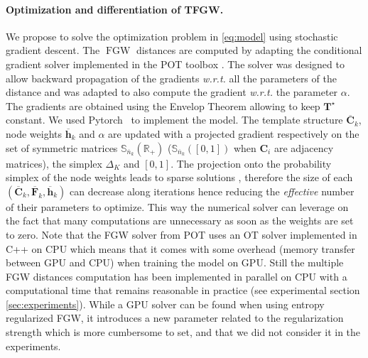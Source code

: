 \documentclass{article}
\def\vh{{\bm{h}}}
\def\mC{{\bm{C}}}
\def\mF{{\bm{F}}}
\def\mT{{\bm{T}}}
\def\sS{{\mathbb{S}}}
\newcommand{\R}{\mathbb{R}}
\newcommand{\FGW}{\operatorname{FGW}}
\begin{document}
\paragraph{Optimization and differentiation of TFGW.} 
We propose to solve the optimization problem in \eqref{eq:model} using stochastic
gradient descent. The $\FGW$ distances are
computed by adapting the conditional gradient solver implemented in the POT
toolbox \cite{flamary2021pot}.
The solver was designed to allow backward propagation of the gradients \textit{w.r.t.}
all the parameters of the distance and was adapted to also compute the gradient
\emph{w.r.t.} the parameter $\alpha$. The gradients are obtained using the
Envelop Theorem \cite{afriat1971theory} allowing to keep $\mT^\star$ constant.
We used Pytorch~\cite{paszke2017automatic} to implement the model. 
The template structure $\overline{\mC}_k$, node weights $\overline{\vh}_k$ and $\alpha$ are updated with a projected gradient respectively on the set of 
symmetric matrices $\sS_{\overline{n}_k}(\R_+)$ ($\sS_{\overline{n}_k}([0,1])$
when $\mC_i$ are adjacency matrices), the simplex $\Delta_K$ and $[0,1]$.
The projection onto the probability simplex of the node weights leads to sparse solutions \cite{condat2016fast}, therefore
the size of each $(\overline{\mC}_k, \overline{\mF}_k, \overline{\vh}_k)$ can decrease along iterations hence reducing the \emph{effective} 
number of their parameters to optimize. This way the numerical solver can leverage on the fact that many computations are unnecessary as soon as the weights are set to zero. Note that the FGW solver from POT uses an OT
solver implemented in C++ on CPU which means that it comes with some overhead (memory
transfer between GPU and CPU) when training the model on GPU. Still the multiple FGW distances computation has been
implemented in parallel on CPU with a computational time that remains reasonable in
practice (see experimental section \ref{sec:experiments}). While a GPU solver can be found when using entropy regularized FGW, it introduces a new parameter related to the regularization strength which is more cumbersome to set, and that we did not consider it in the experiments.





 
 
\end{document}
